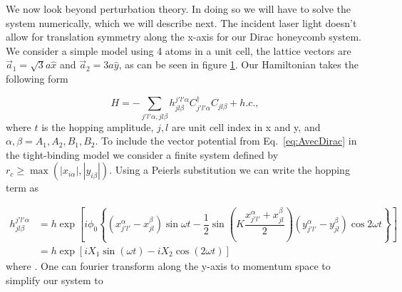 \begin{figure}[h]
  \label{fig:honeycomb}
\end{figure}

We now look beyond perturbation theory.
In doing so we will have to solve the system numerically, which we will describe next.
The incident laser light doesn't allow for translation symmetry along the x-axis for our Dirac honeycomb system.
We consider a simple model using 4 atoms in a unit cell, the lattice vectors are $\vec{a}_1 = \sqrt{3}a\hat{x}$ and $\vec{a}_2 = 3a\hat{y}$, as can be seen in figure \ref{fig:honeycomb}.
Our Hamiltonian takes the following form

\begin{equation}
  H = -\sum_{j'l'\alpha,jl\beta} h^{j'l'\alpha}_{jl\beta} C^{\dagger}_{j'l'\alpha} C_{jl\beta} + h.c.,
\end{equation}
where $t$ is the hopping amplitude, $j,l$ are unit cell index in x and y, and $\alpha,\beta = A_1, A_2, B_1, B_2$.
To include the vector potential from Eq.~\eqref{eq:AvecDirac} in the tight-binding model we consider a finite system defined by $r_c \geq \max(|x_{i\alpha}|,|y_{i\beta}|)$.
Using a Peierls substitution we can write the hopping term as

\begin{align}
h^{j'l'\alpha}_{jl\beta} &= h \exp\left[ i \phi_0 \left\{ (x_{j'l'}^{\alpha} - x_{jl}^{\beta}) \sin{\omega t} - \dfrac{1}{2} \sin\left(K \dfrac{x_{j'l'}^{\alpha} + x_{jl}^{\beta}}{2} \right) (y_{j'l'}^{\alpha} - y_{jl}^{\beta}) \cos{2\omega t}  \right\} \right] \nonumber \\
  &= h \exp\left[ i X_1 \sin(\omega t) -i X_2 \cos(2\omega t)\right]
\end{align}
where $ $.
One can fourier transform along the y-axis to momentum space to simplify our system to

